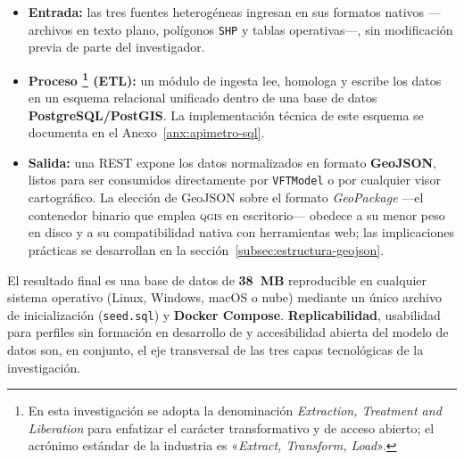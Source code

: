 \begin{itemize}
    \item \textbf{Entrada:} las tres fuentes heterogéneas ingresan en sus
    formatos nativos —archivos \gtfs{} en texto plano, polígonos \texttt{SHP} y
    tablas operativas—, sin modificación previa de parte del investigador.

    \item \textbf{Proceso
    \footnote{En esta investigación se adopta la denominación
    \textit{Extraction, Treatment and Liberation} para enfatizar el carácter
    transformativo y de acceso abierto; el acrónimo estándar de la industria
    es «\textit{Extract, Transform, Load}».}
    (ETL):} un módulo de ingesta lee, homologa y escribe los datos en un
    esquema relacional unificado dentro de una base de datos
    \textbf{PostgreSQL/PostGIS}. La implementación técnica de este esquema se
    documenta en el Anexo~\ref{anx:apimetro-sql}.

    \item \textbf{Salida:} una \api{} REST expone los datos normalizados en
    formato \textbf{GeoJSON}, listos para ser consumidos directamente por
    \texttt{VFTModel} o por cualquier visor cartográfico. La elección de
    GeoJSON sobre el formato \textit{GeoPackage} —el contenedor binario que
    emplea \textsc{qgis} en escritorio— obedece a su menor peso en disco y a su
    compatibilidad nativa con herramientas web; las implicaciones prácticas se
    desarrollan en la sección~\ref{subsec:estructura-geojson}.
\end{itemize}

El resultado final es una base de datos de \textbf{38~MB} reproducible en
cualquier sistema operativo (Linux, Windows, macOS o nube) mediante un único
archivo de inicialización (\texttt{seed.sql}) y \textbf{Docker Compose}.
\textbf{Replicabilidad}, usabilidad para perfiles sin formación en desarrollo de
 y accesibilidad abierta del modelo de datos son, en conjunto, el eje
transversal de las tres capas tecnológicas de la investigación.
